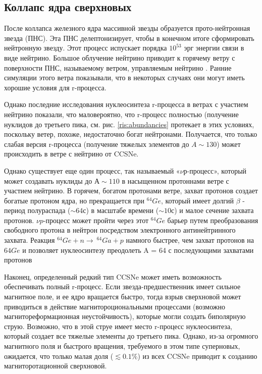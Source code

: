 \documentclass[%
master,    %
natbib,      %
subf,        %
href,        %
colorlinks,  %
]{disser}
\begin{document}
\subsection{Коллапс ядра сверхновых}
После коллапса железного ядра массивной звезды образуется прото-нейтронная звезда (ПНС). Эта ПНС делептонизирует, чтобы в конечном итоге сформировать нейтронную звезду. Этот процесс испускает порядка $10^{53}$ эрг энергии связи в виде нейтрино. Большое облучение нейтрино приводит к горячему ветру с поверхности ПНС, называемому ветром, управляемым нейтрино \cite{neutrino}. Ранние симуляции этого ветра показывали, что в некоторых случаях они могут иметь хорошие условия для r-процесса.

Однако последние исследования нуклеосинтеза r-процесса в ветрах с участием нейтрино показали, что маловероятно, что r-процесс полностью (получение нуклидов до третьего пика, см. рис. \ref{ris:abundancies} протекает в этих условиях, поскольку ветер, похоже, недостаточно богат нейтронами. Получается, что только слабая версия r-процесса (получение тяжелых элементов до $A \sim 130$) может происходить в ветре с нейтрино от CCSNe.

Однако существует еще один процесс, так называемый «$\nu р$-процесс», который может создавать нуклиды до $А \sim 110$ в насыщенном протоннами ветре с участием нейтрино. В горячем, богатом протонами ветре, захват протонов создает богатые протоном ядра, но прекращается при $^{64}Ge$, который имеет долгий $\beta$ - период полураспада ($\sim 64$с) в масштабе времени ($\sim 10$с) и малое сечение захвата протонов. $\nu p$-процесс может пройти через этот $^{64}Ge$ барьер путем преобразования свободного протона в нейтрон посредством электронного антинейтринного захвата. Реакция $^{64}Ge + n \to \ ^{64}Ga + p$ намного быстрее, чем захват протонов на ${64}Ge$ и позволяет нуклеосинтезу преодолеть A = 64 с последующими захватами протонов

Наконец, определенный редкий тип CCSNe может иметь возможность обеспечивать полный r-процесс. Если звезда-предшественник имеет сильное магнитное поле, и ее ядро вращается быстро, тогда взрыв сверхновой может приводиться в действие магнитороциональными процессами (возможно магнитореформационная неустойчивость), которые могли создать биполярную струю. Возможно, что в этой струе имеет место r-процесс нуклеосинтеза, который создает все тяжелые элементы до третьего пика. Однако, из-за огромного магнитного поля и быстрого вращения, требуемого в этом типе суперновых, ожидается, что только малая доля ($\lesssim 0.1 \%$) из всех CCSNe приводит к созданию магниторотационной сверхновой.
\end{document}
